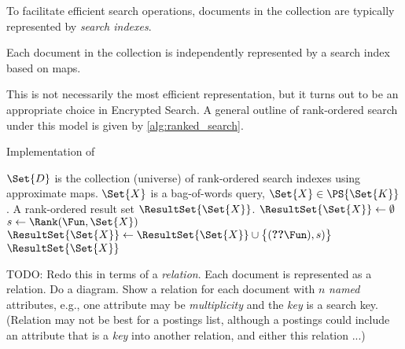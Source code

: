 \documentclass[ ../main.tex]{subfiles}
\begin{document}
To facilitate efficient search operations, documents in the collection are typically represented by \emph{search indexes}.
\begin{assumption}
Each document in the collection is independently represented by a search index based on maps.
\end{assumption}
This is not necessarily the most efficient representation, but it turns out to be an appropriate choice in Encrypted Search. A general outline of rank-ordered search under this model is given by \cref{alg:ranked_search}.
\begin{algorithm}[h]
    \caption{Implementation of \protect\RankOrderedSearch}
    \label{alg:ranked_search}
    \parameters
    {
        $\Set{D}$ is the collection (universe) of rank-ordered search indexes using approximate maps.
    }
    \KwIn
    {
        $\Set{X}$ is a bag-of-words query, $\Set{X} \in \PS{\Set{K}}$.
    }
    \KwOut
    {
        A rank-ordered result set $\ResultSet{\Set{X}}$.
    }
    {
        $\ResultSet{\Set{X}} \gets \emptyset$\;
        {
            $s \gets \Rank(\Fun, \Set{X})$\;
            $\ResultSet{\Set{X}} \gets \ResultSet{\Set{X}} \cup \left\{(\Ref(\Fun), s)\right\}$\;
        }
        \Return $\ResultSet{\Set{X}}$\;
    }
\end{algorithm}

TODO: Redo this in terms of a \emph{relation}. Each document is represented as a relation. Do a diagram. Show a relation for each document with $n$ \emph{named} attributes, e.g., one attribute may be \emph{multiplicity} and the \emph{key} is a search key. (Relation may not be best for a postings list, although a postings could include an attribute that is a \emph{key} into another relation, and either this relation ...)
\end{document}
